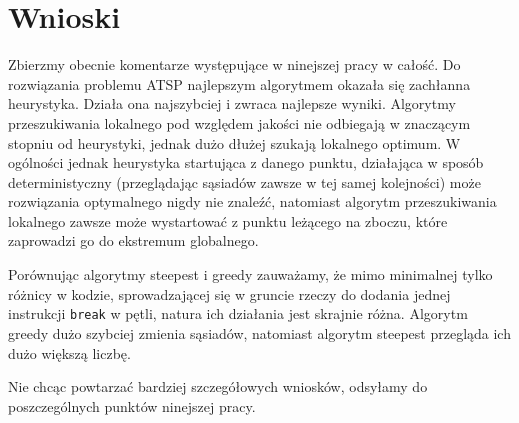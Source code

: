 \section{Wnioski}
Zbierzmy obecnie komentarze występujące w ninejszej pracy w całość. Do rozwiązania problemu ATSP najlepszym algorytmem okazała się zachłanna heurystyka. Działa ona najszybciej i zwraca najlepsze wyniki. Algorytmy przeszukiwania lokalnego pod względem jakości nie odbiegają w znaczącym stopniu od heurystyki, jednak dużo dłużej szukają lokalnego optimum. W ogólności jednak heurystyka startująca z danego punktu, działająca w sposób deterministyczny (przeglądając sąsiadów zawsze w tej samej kolejności) może rozwiązania optymalnego nigdy nie znaleźć, natomiast algorytm przeszukiwania lokalnego zawsze może wystartować z punktu leżącego na zboczu, które zaprowadzi go do ekstremum globalnego.

Porównując algorytmy steepest i greedy zauważamy, że mimo minimalnej tylko różnicy w kodzie, sprowadzającej się w gruncie rzeczy do dodania jednej instrukcji \texttt{break} w pętli, natura ich działania jest skrajnie różna. Algorytm greedy dużo szybciej zmienia sąsiadów, natomiast algorytm steepest przegląda ich dużo większą liczbę.

Nie chcąc powtarzać bardziej szczegółowych wniosków, odsyłamy do poszczególnych punktów ninejszej pracy.